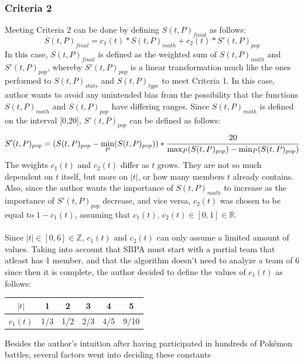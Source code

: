 \documentclass{article}
\begin{document}
\subsubsection{Criteria 2}
Meeting Criteria 2 can be done by defining $S(t,P)_{final}$ as follows:
\begin{equation*}
S(t,P)_{final}=c_1(t)*S(t,P)_{math}+c_2(t)*S'(t,P)_{pop}
\end{equation*}
In this case, $S(t,P)_{final}$ is defined as the weighted sum of $S(t,P)_{math}$ and $S'(t,P)_{pop}$, whereby $S'(t,P)_{pop}$ is a linear transformation much like the ones performed to $S(t,P)_{stats}$ and $S(t,P)_{type}$ to meet Criteria 1. In this case, author wants to avoid any unintended bias from the possibility that the functions $S(t,P)_{math}$ and $S(t,P)_{pop}$ have differing ranges. Since $S(t,P)_{math}$ is defined on the interval [0,20], $S'(t,P)_{pop}$ can be defined as follows:
\begin{equation*}
S'(t,P)_{pop}=(S(t,P)_{pop}-\min_P(S(t,P)_{pop}))*\cfrac{20}{\max_P(S(t,P)_{pop})-\min_P(S(t,P)_{pop})}
\end{equation*}
The weights $c_1(t)$ and $c_2(t)$ differ as $t$ grows. They are not so much dependent on $t$ itself, but more on $|t|$, or how many members $t$ already contains. Also, since the author wants the importance of $S(t,P)_{math}$ to increase as the importance of $S'(t,P)_{pop}$ decrease, and vice versa, $c_2(t)$ was chosen to be equal to $1-c_1(t)$, assuming that $c_1(t)\text{, }c_2(t)\in[0,1]\in\mathbb{R}$.\\\\
Since $|t|\in [0,6]\in\mathbb{Z}$, $c_1(t)$ and $c_2(t)$ can only assume a limited amount of values. Taking into account that SBPA must start with a partial team that atleast has 1 member, and that the algorithm doesn't need to analyze a team of 6 since then it is complete, the author decided to define the values of $c_1(t)$ as follows:
\begin{center}
	\begin{tabular}{c||c|c|c|c|c}
		$|t|$&1&2&3&4&5\\
		\hline
		$c_1(t)$&1/3&1/2&2/3&4/5&9/10
	\end{tabular}
\end{center}
Besides the author's intuition after having participated in hundreds of Pok\'emon battles, several factors went into deciding these constants
\end{document}
